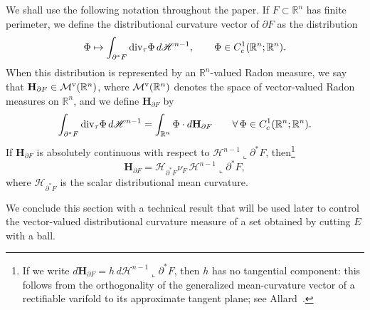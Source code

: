 \documentclass[reqno,11pt]{amsart}
\newcommand{\R}{\mathbb R}
\numberwithin{equation}{section}
\theoremstyle{remark}
\begin{document}
We shall use the following notation throughout the paper. If $F\subset \R^n$
has finite perimeter, we define the distributional curvature vector of
$\partial F$ as the distribution
\[
\Phi\mapsto \int_{\partial^*F}{\rm div}_\tau \Phi\,d\mathscr H^{n-1},
\qquad \Phi\in C_c^1(\R^n;\R^n).
\]
When this distribution is represented by an $\R^n$-valued Radon measure, we say
that $\mathbf H_{\partial F}\in\mathcal M^{\rm v}(\R^n)$, where
$\mathcal M^{\rm v}(\R^n)$ denotes the space of vector-valued Radon measures on
$\R^n$, and we define $\mathbf H_{\partial F}$ by
\begin{equation}\label{eq:vector curvature measure}
\int_{\partial^*F}{\rm div}_\tau \Phi\,d\mathscr H^{n-1}
=\int_{\R^n}\Phi\cdot d\mathbf H_{\partial F}
\qquad \forall\,\Phi\in C_c^1(\R^n;\R^n).
\end{equation}
If $\mathbf H_{\partial F}$ is absolutely continuous with respect to
$\mathscr H^{n-1}\llcorner\partial^*F$, then\footnote{If we write
$d\mathbf H_{\partial F}=h\,d\mathscr H^{n-1}\llcorner\partial^*F$, then
$h$ has no tangential component: this follows from the orthogonality
of the generalized mean-curvature vector of a rectifiable varifold to its
approximate tangent plane; see Allard~\cite[Section~4]{A1972}.}
\[
\mathbf H_{\partial F}
=\mathcal H_{\partial^*F}\nu_F\,\mathscr H^{n-1}\llcorner\partial^*F,
\]
where $\mathcal H_{\partial^*F}$ is the scalar distributional mean curvature.




We conclude this section with a technical result that will be used later to
control the vector-valued distributional curvature measure of a set obtained
by cutting $E$ with a ball.
\end{document}

